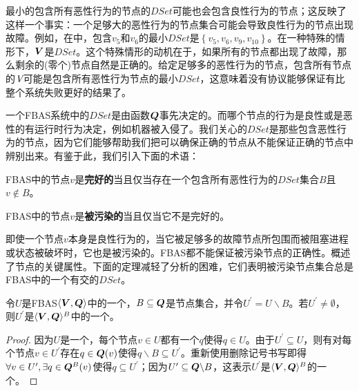 最小的包含所有恶性行为的节点的$DSet$可能也会包含良性行为的节点；这反映了这样一个事实：一个足够大的恶性行为的节点集合可能会导致良性行为的节点出现故障。例如，在中，包含$v_5$和$v_6$的最小$DSet$是$\left\{v_5,v_6,v_9,v_{10}\right\}$。在一种特殊的情形下，${\bm V}$是$DSet$。这个特殊情形的动机在于，如果所有的节点都出现了故障，那么剩余的(零个)节点自然是正确的。给定足够多的恶性行为的节点，包含所有节点的$\emph{V}$可能是包含所有恶性行为节点的最小$DSet$，这意味着没有协议能够保证有比整个系统失败更好的结果了。

一个FBAS系统中的$DSet$是由{\quorum}函数${\bm Q}$事先决定的。而哪个节点的行为是良性或是恶性的有运行时行为决定，例如机器被入侵了。我们关心的$DSet$是那些包含恶性行为的节点，因为它们能够帮助我们把可以确保正确的节点从不能保证正确的节点中辨别出来。有鉴于此，我们引入下面的术语：

\begin{definition}[完好的]
        FBAS中的节点$v$是\textbf{完好的}当且仅当存在一个包含所有恶性行为的$DSet$集合$B$且$v\not\in B$。
\end{definition}

\begin{definition}[被污染的]
        FBAS中的节点$v$是\textbf{被污染的}当且仅当它不是完好的。
\end{definition}

即使一个节点$v$本身是良性行为的，当它被足够多的故障节点所包围而被阻塞进程或状态被破坏时，它也是被污染的。FBAS都不能保证被污染节点的正确性。概述了节点的关键属性。下面的定理减轻了分析的困难，它们表明被污染节点集合总是FBAS中的一个有{\quorum}交的$DSet$。

\begin{theorem}\label{th1}
        令$U$是FBAS$\langle{\bm V},{\bm Q}\rangle$中的一个{\quorum}，$B\subseteq {\bm Q}$是节点集合，并令$U^\prime=U\backslash B$。若$U^\prime\neq \emptyset$，则$U^\prime$是$\langle{\bm V},{\bm Q}\rangle^B$中的一个{\quorum}。
\end{theorem}

\begin{proof}
        因为$U$是一个{\quorum}，每个节点$v\in U$都有一个$q$使得$q\in U$。由于$U^\prime\subseteq U$，则有对每个节点$v\in U^\prime$存在$q\in{\bm Q}(v)$使得$q\backslash B\subseteq U^\prime$。重新使用删除记号书写即得$\forall v\in U^\prime,\exists q\in{\bm Q}^B(v)$使得$q\subseteq U^\prime$；因为$U^\prime \subseteq {\bm Q}\backslash B$，这表示$U^\prime$是$\langle{\bm V},{\bm Q}\rangle^B$的一个{\quorum}。
\end{proof}

